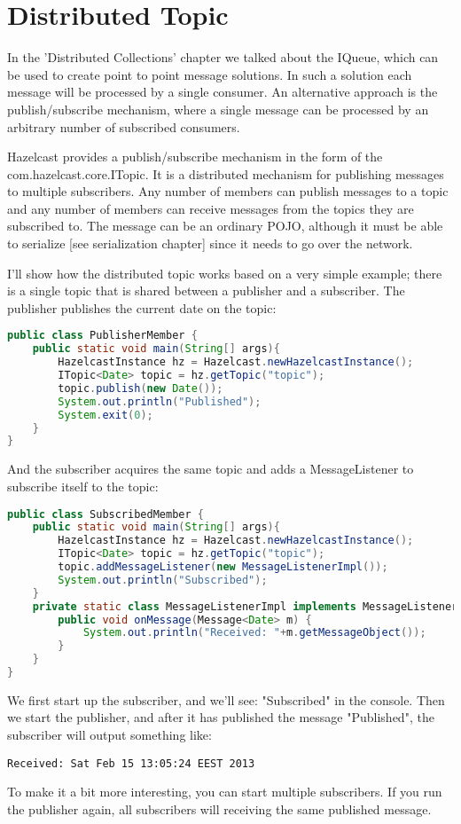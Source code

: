 \chapter{Distributed Topic}
In the 'Distributed Collections' chapter we talked about the IQueue, which can be used to create point to point message solutions. In such a solution each message will be processed by a single consumer. An alternative approach is the publish/subscribe mechanism, where a single message can be processed by an arbitrary number of subscribed consumers.

Hazelcast provides a publish/subscribe mechanism in the form of the com.hazelcast.core.ITopic. It is a distributed mechanism for publishing messages to multiple subscribers. Any number of members can publish messages to a topic and any number of members can receive messages from the topics they are subscribed to. The message can be an ordinary POJO, although it must be able to serialize [see serialization chapter] since it needs to go over the network.

I'll show how the distributed topic works based on a very simple example; there is a single topic that is shared between a publisher and a subscriber. The publisher publishes the current date on the topic:
\begin{lstlisting}[language=java]
public class PublisherMember {
    public static void main(String[] args){
        HazelcastInstance hz = Hazelcast.newHazelcastInstance();
        ITopic<Date> topic = hz.getTopic("topic");
        topic.publish(new Date());
        System.out.println("Published");
        System.exit(0);
    }
}
\end{lstlisting}
And the subscriber acquires the same topic and adds a MessageListener to subscribe itself to the topic:
\begin{lstlisting}[language=java]
public class SubscribedMember {
    public static void main(String[] args){
        HazelcastInstance hz = Hazelcast.newHazelcastInstance();
        ITopic<Date> topic = hz.getTopic("topic");
        topic.addMessageListener(new MessageListenerImpl());
        System.out.println("Subscribed");
    }
    private static class MessageListenerImpl implements MessageListener<Date> {
        public void onMessage(Message<Date> m) {
            System.out.println("Received: "+m.getMessageObject());
        }
    }
}
\end{lstlisting}
We first start up the subscriber, and we'll see: "Subscribed" in the console. Then we start the publisher, and after it has published the message "Published", the subscriber will output something like:
\begin{lstlisting}
Received: Sat Feb 15 13:05:24 EEST 2013
\end{lstlisting}
To make it a bit more interesting, you can start multiple subscribers. If you run the publisher again, all subscribers will receiving the same published message.

